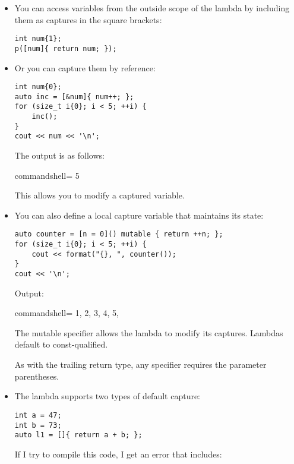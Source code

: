 \begin{itemize}
\item 
You can access variables from the outside scope of the lambda by including them as captures in the square brackets:

\begin{lstlisting}[style=styleCXX]
int num{1};
p([num]{ return num; });
\end{lstlisting}

\item 
Or you can capture them by reference:

\begin{lstlisting}[style=styleCXX]
int num{0};
auto inc = [&num]{ num++; };
for (size_t i{0}; i < 5; ++i) {
	inc();
}
cout << num << '\n';
\end{lstlisting}

The output is as follows:

\begin{tcblisting}{commandshell={}}
5
\end{tcblisting}

This allows you to modify a captured variable.


\item 

You can also define a local capture variable that maintains its state:

\begin{lstlisting}[style=styleCXX]
auto counter = [n = 0]() mutable { return ++n; };
for (size_t i{0}; i < 5; ++i) {
	cout << format("{}, ", counter());
}
cout << '\n';
\end{lstlisting}

Output:

\begin{tcblisting}{commandshell={}}
1, 2, 3, 4, 5,
\end{tcblisting}

The mutable specifier allows the lambda to modify its captures. Lambdas default to const-qualified.

As with the trailing return type, any specifier requires the parameter parentheses.

\item 
The lambda supports two types of default capture:

\begin{lstlisting}[style=styleCXX]
int a = 47;
int b = 73;
auto l1 = []{ return a + b; };
\end{lstlisting}

If I try to compile this code, I get an error that includes:


\end{itemize}
